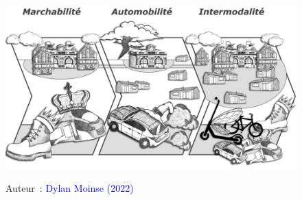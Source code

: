     \begin{figure}[h!]\vspace*{4pt}
        \caption*{}
        \label{fig-preambule:mt180}
        \centerline{\includegraphics[width=1\columnwidth]{src/Figures/Preambule/FR_MT180_Illustration.jpg}}
        \vspace{5pt}
        \begin{flushright}\scriptsize{
        Auteur~: \textcolor{blue}{Dylan Moinse (2022)}
        }\end{flushright}
    \end{figure}
